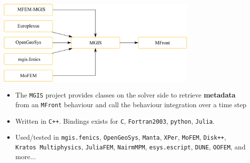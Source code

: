 \documentclass{beamer}
\begin{document}
\begin{frame}
  \begin{center}
    \includegraphics[width=0.75\textwidth]{img/mgis.pdf}
  \end{center}
  \begin{itemize}
    \item The {\tt MGIS} project provides classes on the solver
    side to retrieve {\bf metadata} from an {\tt MFront} behaviour and
    call the behaviour integration over a time step
    \item Written in \texttt{C++}. Bindings exists for
    \texttt{C}, \texttt{Fortran2003}, \texttt{python}, \texttt{Julia}.
    \item Used/tested in \texttt{mgis.fenics},
    \texttt{OpenGeoSys}, \texttt{Manta}, \texttt{XPer}, \texttt{MoFEM},
    \texttt{Disk++}, \texttt{Kratos Multiphysics}, \texttt{JuliaFEM},
    \texttt{NairmMPM}, \texttt{esys.escript}, \texttt{DUNE},
    \texttt{OOFEM}, and more...
  \end{itemize}
\end{frame}
\end{document}
